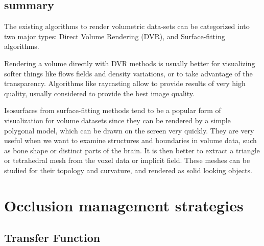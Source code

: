 \subsection{summary}
The existing algorithms to render volumetric data-sets can be categorized into two major types: Direct Volume Rendering (DVR), and Surface-fitting algorithms.


Rendering a volume directly with DVR methods is usually better for visualizing softer things like flows fields and density variations, or to take advantage of the transparency. Algorithms like raycasting allow to provide results of very high quality, usually considered to provide the best image quality. 


Isosurfaces from surface-fitting methods tend to be a popular form of visualization for volume datasets since they can be rendered by a simple polygonal model, which can be drawn on the screen very quickly. They are very useful when we want to examine structures and boundaries in volume data, such as bone shape or distinct parts of the brain. It is then better to extract a triangle or tetrahedral mesh from the voxel data or implicit field. These meshes can be studied for their topology and curvature, and rendered as solid looking objects.



\section{Occlusion management strategies}



\subsection{Transfer Function}

